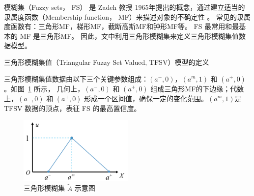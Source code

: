 模糊集（Fuzzy sets， FS） 是 Zadeh 教授 1965年提出的概念，通过建立适当的隶属度函数（Membership function， MF）来描述对象的不确定性 \cite{zadeh1965fuzzy}。 常见的隶属度函数有：三角形MF，梯形MF，截断高斯MF和钟形MF等。 FS 最常用和最基本的 MF 是三角形MF。 因此，文中利用三角形模糊集来定义三角形模糊集值数据模型。

\begin{definition}
    \label{define1}
    三角形模糊集值（Triangular Fuzzy Set Valued, TFSV）模型的定义
\end{definition}
三角形模糊集值数据由以下三个关键参数组成：$(a^-,0)$，$(a^m,1)$ 和 $(a^+,0)$。如图~\ref{fig:tfs} 所示，  几何上，$(a^-,0)$ 和 $(a^+,0)$ 组成三角形MF的下边缘；代数上，$(a^-,0)$ 和 $(a^+,0)$ 形成一个区间值，确保一定的变化范围。$(a^m,1)$是TFSV 数据的顶点，表征 FS 的最高置信度。
\begin{figure}[!htb]
    \centering
    \includegraphics[width=0.5\textwidth]{figures/tfs}
    \caption{三角形模糊集 $\tilde{A}$ 示意图}
    \label{fig:tfs}
\end{figure}

